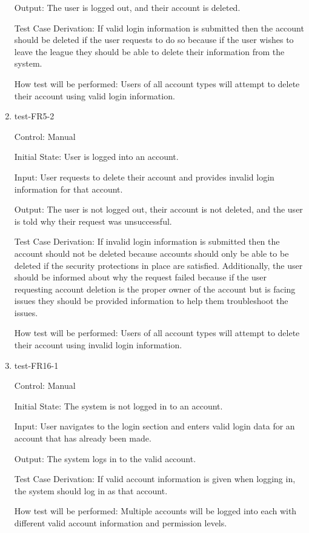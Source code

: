 \documentclass[12pt, titlepage]{article}
\begin{document}
\begin{enumerate}
  Output: The user is logged out, and their account is deleted.

  Test Case Derivation: If valid login information is submitted then the
  account should be deleted if the user requests to do so because if the user
  wishes to leave the league they should be able to delete their information
  from the system.

  How test will be performed: Users of all account types will attempt to delete
  their account using valid login information.

  \item{test-FR5-2\\}

  Control: Manual

  Initial State: User is logged into an account.

  Input: User requests to delete their account and provides invalid login
  information for that account.

  Output: The user is not logged out, their account is not deleted, and
  the user is told why their request was unsuccessful.

  Test Case Derivation: If invalid login information is submitted then the
  account should not be deleted because accounts should only be able to be
  deleted if the security protections in place are satisfied. Additionally,
  the user should be informed about why the request failed because if the
  user requesting account deletion is the proper owner of the account but is
  facing issues they should be provided information to help them troubleshoot
  the issues.

  How test will be performed: Users of all account types will attempt to delete
  their account using invalid login information.

  \item{test-FR16-1\\}

  Control: Manual

  Initial State: The system is not logged in to an account.

  Input: User navigates to the login section and enters valid login data for
  an account that has already been made.

  Output: The system logs in to the valid account.

  Test Case Derivation: If valid account information is given when logging in,
  the system should log in as that account.

  How test will be performed: Multiple accounts will be logged into each with
  different valid account information and permission levels.


\end{enumerate}
\end{document}

